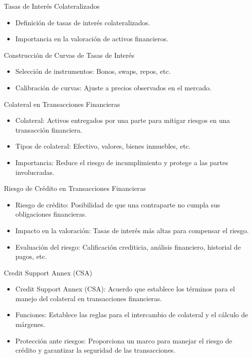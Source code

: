 \documentclass{beamer}
\begin{document}
	\begin{frame}{Tasas de Interés Colateralizados}
		\begin{itemize}
			\item Definición de tasas de interés colateralizados.
			\item Importancia en la valoración de activos financieros.
		\end{itemize}
	\end{frame}
	
	\begin{frame}{Construcción de Curvas de Tasas de Interés}
		\begin{itemize}
			\item Selección de instrumentos: Bonos, swaps, repos, etc.
			\item Calibración de curvas: Ajuste a precios observados en el mercado.
		\end{itemize}
	\end{frame}
	
	\begin{frame}{Colateral en Transacciones Financieras}
		\begin{itemize}
			\item Colateral: Activos entregados por una parte para mitigar riesgos en una transacción financiera.
			\item Tipos de colateral: Efectivo, valores, bienes inmuebles, etc.
			\item Importancia: Reduce el riesgo de incumplimiento y protege a las partes involucradas.
		\end{itemize}
	\end{frame}
	
	\begin{frame}{Riesgo de Crédito en Transacciones Financieras}
		\begin{itemize}
			\item Riesgo de crédito: Posibilidad de que una contraparte no cumpla sus obligaciones financieras.
			\item Impacto en la valoración: Tasas de interés más altas para compensar el riesgo.
			\item Evaluación del riesgo: Calificación crediticia, análisis financiero, historial de pagos, etc.
		\end{itemize}
	\end{frame}
	
	\begin{frame}{Credit Support Annex (CSA)}
		\begin{itemize}
			\item Credit Support Annex (CSA): Acuerdo que establece los términos para el manejo del colateral en transacciones financieras.
			\item Funciones: Establece las reglas para el intercambio de colateral y el cálculo de márgenes.
			\item Protección ante riesgos: Proporciona un marco para manejar el riesgo de crédito y garantizar la seguridad de las transacciones.
		\end{itemize}
	\end{frame}
	
\end{document}
